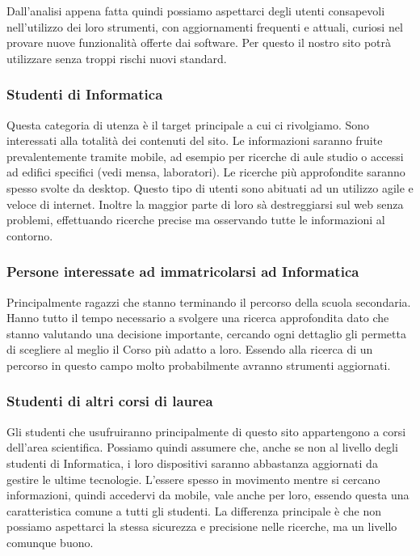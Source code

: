 Dall'analisi appena fatta quindi possiamo aspettarci degli utenti consapevoli nell'utilizzo dei loro strumenti, con aggiornamenti frequenti e attuali, curiosi nel provare nuove funzionalità offerte dai software. Per questo il nostro sito potrà utilizzare senza troppi rischi nuovi standard.

\subsubsection{Studenti di Informatica}
Questa categoria di utenza è il target principale a cui ci rivolgiamo. Sono interessati alla totalità dei contenuti del sito. 
Le informazioni saranno fruite prevalentemente tramite mobile, ad esempio per ricerche di aule studio o accessi ad edifici specifici (vedi mensa, laboratori). Le ricerche più approfondite saranno spesso svolte da desktop. 
Questo tipo di utenti sono abituati ad un utilizzo agile e veloce di internet. Inoltre la maggior parte di loro sà destreggiarsi sul web senza problemi, effettuando ricerche precise ma osservando tutte le informazioni al contorno. 

\subsubsection{Persone interessate ad immatricolarsi ad Informatica}
Principalmente ragazzi che stanno terminando il percorso della scuola secondaria. Hanno tutto il tempo necessario a svolgere una ricerca approfondita dato che stanno valutando una decisione importante, cercando ogni dettaglio gli permetta di scegliere al meglio il Corso più adatto a loro. Essendo alla ricerca di un percorso in questo campo molto probabilmente avranno strumenti aggiornati.

\subsubsection{Studenti di altri corsi di laurea}
Gli studenti che usufruiranno principalmente di questo sito appartengono a corsi dell'area scientifica. Possiamo quindi assumere che, anche se non al livello degli studenti di Informatica, i loro dispositivi saranno abbastanza aggiornati da gestire le ultime tecnologie. L'essere spesso in movimento mentre si cercano informazioni, quindi accedervi da mobile, vale anche per loro, essendo questa una caratteristica comune a tutti gli studenti. La differenza principale è che non possiamo aspettarci la stessa sicurezza e precisione nelle ricerche, ma un livello comunque buono.

